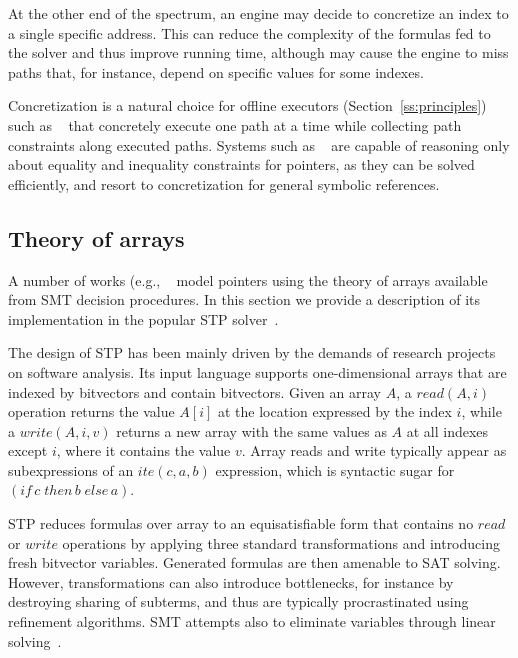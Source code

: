 At the other end of the spectrum, an engine may decide to concretize an index to a single specific address. This can reduce the complexity of the formulas fed to the solver and thus improve running time, although may cause the engine to miss paths that, for instance, depend on specific values for some indexes. 

Concretization is a natural choice for offline executors (Section~\ref{ss:principles}) such as ~\cite{DART-PLDI05,SAGE-NDSS08} that concretely execute one path at a time while collecting path constraints along executed paths. Systems such as ~\cite{CREST-ASE08,CUTE-FSE13} are capable of reasoning only about equality and inequality constraints for pointers, as they can be solved efficiently, and resort to concretization for general symbolic references.


\subsection{Theory of arrays}
\label{ss:theory-arrays}

A number of works (e.g., ~\cite{EXE-CCS06,KLEE-OSDI08,SAGE-NDSS08} model pointers using the theory of arrays available from SMT decision procedures. In this section we provide a description of its implementation in the popular STP solver~\cite{STP-CAV07}.

The design of STP has been mainly driven by the demands of research projects on software analysis. Its input language supports one-dimensional arrays that are indexed by bitvectors and contain bitvectors. Given an array $A$, a $read(A,i)$ operation returns the value $A[i]$ at the location expressed by the index $i$, while a $write(A,i,v)$ returns a new array with the same values as $A$ at all indexes except $i$, where it contains the value $v$. Array reads and write typically appear as subexpressions of an $ite(c,a,b)$ expression, which is syntactic sugar for $(if\,c\;then\,b\;else\,a)$.

STP reduces formulas over array to an equisatisfiable form that contains no $read$ or $write$ operations by applying three standard transformations and introducing fresh bitvector variables. Generated formulas are then amenable to SAT solving. However, transformations can also introduce bottlenecks, for instance by destroying sharing of subterms, and thus are typically procrastinated using refinement algorithms. SMT attempts also to eliminate variables through linear solving~\cite{STP-CAV07}.

